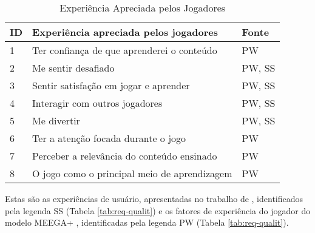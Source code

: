 \begin{apendicesenv}
\begin{table}[htbp]
\centering
\caption{ Experiência Apreciada pelos Jogadores}
\label{tab:exp-player}
\begin{tabular}{|p{1cm}|p{8.5cm}|p{1.5cm}|}
\hline
\textbf{ID} & \textbf{Experiência apreciada pelos jogadores} & Fonte \\ \hline
1                 & Ter confiança de que aprenderei o conteúdo & PW  \\ \hline
2                 & Me sentir desafiado        &  PW, SS        \\ \hline
3                 & Sentir satisfação em jogar e aprender & PW, SS \\ \hline
4                 & Interagir com outros jogadores    &   PW, SS     \\ \hline
5                 & Me divertir           &   PW, SS             \\ \hline
6                 & Ter a atenção focada durante o jogo    &  PW    \\ \hline
7                 & Perceber a relevância do conteúdo ensinado & PW   \\ \hline
8                 & O jogo como o principal meio de aprendizagem  & PW  \\ \hline
\end{tabular}
\end{table}

Estas são as experiências de usuário, apresentadas no trabalho de , identificados pela legenda SS (Tabela \ref{tab:req-qualit}) e os fatores de experiência do jogador do modelo MEEGA+ \cite{Petri_Wangenheim_2019}, identificadas pela legenda PW (Tabela \ref{tab:req-qualit}).


   

\end{apendicesenv}
